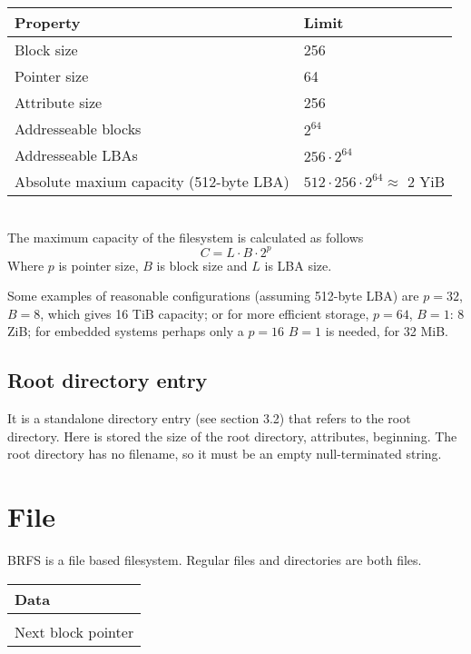 \documentclass[]{article}
\begin{document}
	\begin{tabular}{|l|l|} 
		\hline
		\textbf{Property} & \textbf{Limit} \\ [0.5ex] 
		\hline
		Block size & 256 \\ 
		\hline
		Pointer size & 64 \\
		\hline
		Attribute size & 256 \\
		\hline
		Addresseable blocks & $2^{64}$ \\
		\hline	
		Addresseable LBAs & $256 \cdot 2^{64}$ \\
		\hline
		Absolute maxium capacity (512-byte LBA) & $512 \cdot 256 \cdot 2^{64} \approx $ 2 YiB \\
		\hline
	\end{tabular}\\

	The maximum capacity of the filesystem is calculated as follows
	\begin{equation}
		C = L \cdot B \cdot 2^p
	\end{equation}
	Where $p$ is pointer size, $B$ is block size and $L$ is LBA size.
	
	Some examples of reasonable configurations (assuming 512-byte LBA) are $p = 32$, $B = 8$, which gives 16 TiB capacity; or for more efficient storage, $p = 64$, $B = 1$: 8 ZiB; for embedded systems perhaps only a $p = 16$ $B = 1$ is needed, for 32 MiB.

	\subsection{Root directory entry}
	
	It is a standalone directory entry (see section 3.2) that refers to the root directory. Here is stored the size of the root directory, attributes, beginning. The root directory has no filename, so it must be an empty null-terminated string.

	\section{File}
	
	BRFS is a file based filesystem. Regular files and directories are both files. 
	
	\begin{tabular}{|l|} 
		\hline
		Data \\
		\hline
		[Padding] \\
		\hline
		Next block pointer \\
		\hline
	\end{tabular}
\end{document}
